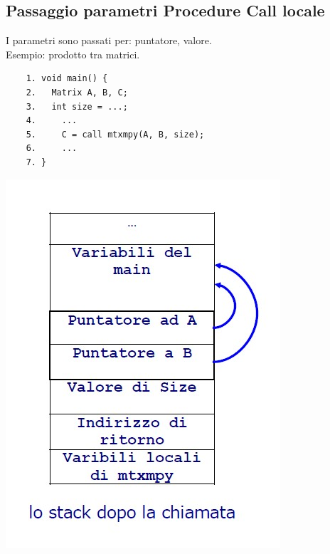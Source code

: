\subsection{Passaggio parametri Procedure Call locale}
I parametri sono passati per: puntatore, valore.
\\Esempio: prodotto tra matrici.
\begin{verbatim}
    1. void main() {
    2.   Matrix A, B, C;
    3.   int size = ...;
    4.     ...
    5.     C = call mtxmpy(A, B, size);
    6.     ...
    7. }
\end{verbatim}
\begin{center}
    \includegraphics[scale=0.5]{img/RPC_passaggioparametri2.jpg}
\end{center}

